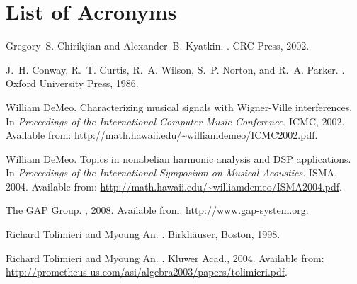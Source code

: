 \documentclass[11pt]{article}
\begin{document}
\vskip5mm



\section*{List of Acronyms}
\begin{acronym}
\end{acronym}



\def\cprime{$'$} \def\cprime{$'$}
  \def\ocirc#1{\ifmmode\setbox0=\hbox{$#1$}\dimen0=\ht0 \advance\dimen0
  by1pt\rlap{\hbox to\wd0{\hss\raise\dimen0
  \hbox{\hskip.2em$\scriptscriptstyle\circ$}\hss}}#1\else {\accent"17 #1}\fi}
\begin{thebibliography}{1}

Gregory~S. Chirikjian and Alexander~B. Kyatkin.
.
\newblock CRC Press, 2002.

J.~H. Conway, R.~T. Curtis, R.~A. Wilson, S.~P. Norton, and R.~A. Parker.
.
\newblock Oxford University Press, 1986.

William DeMeo.
\newblock Characterizing musical signals with {W}igner-{V}ille interferences.
\newblock In {\em Proceedings of the International Computer Music Conference}.
  ICMC, 2002.
\newblock Available from:
  \url{http://math.hawaii.edu/~williamdemeo/ICMC2002.pdf}.

William DeMeo.
\newblock Topics in nonabelian harmonic analysis and {DSP} applications.
\newblock In {\em Proceedings of the International Symposium on Musical
  Acoustics}. ISMA, 2004.
\newblock Available from:
  \url{http://math.hawaii.edu/~williamdemeo/ISMA2004.pdf}.

The GAP Group.
,
  2008.
\newblock Available from: \url{http://www.gap-system.org}.

Richard Tolimieri and Myoung An.
.
\newblock Birkh\"{a}user, Boston, 1998.

Richard Tolimieri and Myoung An.
.
\newblock Kluwer Acad., 2004.
\newblock Available from:
  \url{http://prometheus-us.com/asi/algebra2003/papers/tolimieri.pdf}.

\end{thebibliography}
\end{document}

